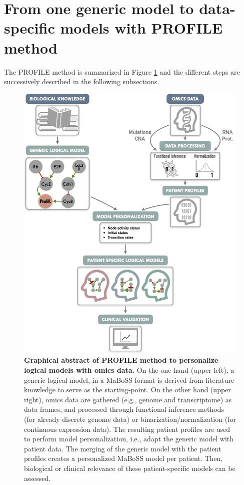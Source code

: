 \documentclass[a4paper,12pt,twoside,onecolumn,openright,final,oldfontcommands]{memoir}
\begin{document}
\section{From one generic model to data-specific models with PROFILE
method}\label{from-one-generic-model-to-data-specific-models-with-profile-method}

The PROFILE method is summarized in Figure \ref{fig:PROFILE-abstract}
and the different steps are successively described in the following
subsections.

\begin{figure}

{\centering \includegraphics[width=0.8\linewidth]{fig/PROFILE-abstract} 

}

\caption[Graphical abstract of PROFILE method to personalize logical models with omics data]{\textbf{Graphical abstract of PROFILE
method to personalize logical models with omics data.} On the one hand
(upper left), a generic logical model, in a MaBoSS format is derived
from literature knowledge to serve as the starting-point. On the other
hand (upper right), omics data are gathered (e.g., genome and
transcriptome) as data frames, and processed through functional
inference methods (for already discrete genome data) or
binarization/normalization (for continuous expression data). The
resulting patient profiles are used to perform model personalization,
i.e., adapt the generic model with patient data. The merging of the
generic model with the patient profiles creates a personalized MaBoSS
model per patient. Then, biological or clinical relevance of these
patient-specific models can be assessed.}\label{fig:PROFILE-abstract}
\end{figure}
\end{document}
